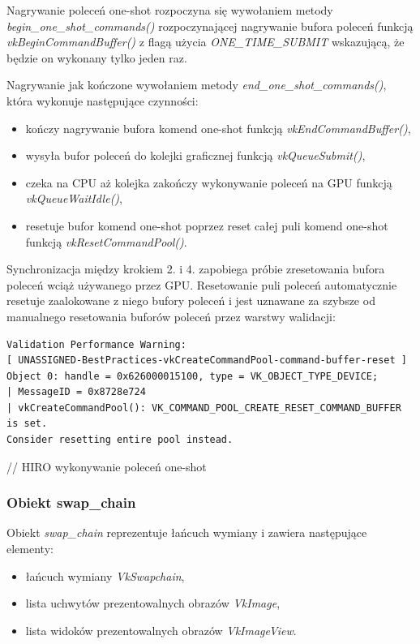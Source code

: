 Nagrywanie poleceń one-shot rozpoczyna się wywołaniem metody \textit{begin\_one\_shot\_commands()} rozpoczynającej nagrywanie bufora poleceń funkcją \textit{vkBeginCommandBuffer()} z flagą użycia \textit{ONE\_TIME\_SUBMIT} wskazującą, że będzie on wykonany tylko jeden raz.

Nagrywanie jak kończone wywołaniem metody \textit{end\_one\_shot\_commands()}, która wykonuje następujące czynności:
\begin{itemize}
	\item kończy nagrywanie bufora komend one-shot funkcją \textit{vkEndCommandBuffer()},
	\item wysyła bufor poleceń do kolejki graficznej funkcją \textit{vkQueueSubmit()},
	\item czeka na CPU aż kolejka zakończy wykonywanie poleceń na GPU funkcją \textit{vkQueueWaitIdle()},
	\item resetuje bufor komend one-shot poprzez reset całej puli komend one-shot funkcją \textit{vkResetCommandPool()}.
\end{itemize}
Synchronizacja między krokiem 2. i 4. zapobiega próbie zresetowania bufora poleceń wciąż używanego przez GPU. Resetowanie puli poleceń automatycznie resetuje zaalokowane z niego bufory poleceń i jest uznawane za szybsze od manualnego resetowania buforów poleceń przez warstwy walidacji:
\lstset{language=verbatim}
\begin{lstlisting}[caption={Ostrzeżenie wydajnościowe wyemitowane przez warstwy walidacji},captionpos=b]
Validation Performance Warning:
[ UNASSIGNED-BestPractices-vkCreateCommandPool-command-buffer-reset ]
Object 0: handle = 0x626000015100, type = VK_OBJECT_TYPE_DEVICE;
| MessageID = 0x8728e724
| vkCreateCommandPool(): VK_COMMAND_POOL_CREATE_RESET_COMMAND_BUFFER is set.
Consider resetting entire pool instead.
\end{lstlisting}

// HIRO wykonywanie poleceń one-shot

\subsubsection{Obiekt swap\_chain}
Obiekt \textit{swap\_chain} reprezentuje łańcuch wymiany i zawiera następujące elementy:
\begin{itemize}
	\item łańcuch wymiany \textit{VkSwapchain},
	\item lista uchwytów prezentowalnych obrazów \textit{VkImage},
	\item lista widoków prezentowalnych obrazów \textit{VkImageView}.
\end{itemize}

